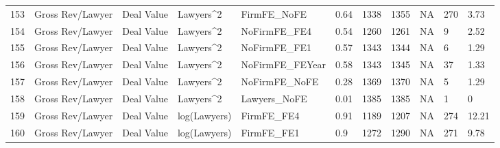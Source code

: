 \documentclass{article}
\begin{document}
\begin{table}[H]
\begin{tabular}{rllllllllll}
  153 & Gross Rev/Lawyer & Deal Value & Lawyers^2 & FirmFE\_NoFE & 0.64 & 1338 & 1355 & NA & 270 & 3.73 \\ 
  154 & Gross Rev/Lawyer & Deal Value & Lawyers^2 & NoFirmFE\_FE4 & 0.54 & 1260 & 1261 & NA & 9 & 2.52 \\ 
  155 & Gross Rev/Lawyer & Deal Value & Lawyers^2 & NoFirmFE\_FE1 & 0.57 & 1343 & 1344 & NA & 6 & 1.29 \\ 
  156 & Gross Rev/Lawyer & Deal Value & Lawyers^2 & NoFirmFE\_FEYear & 0.58 & 1343 & 1345 & NA & 37 & 1.33 \\ 
  157 & Gross Rev/Lawyer & Deal Value & Lawyers^2 & NoFirmFE\_NoFE & 0.28 & 1369 & 1370 & NA & 5 & 1.29 \\ 
  158 & Gross Rev/Lawyer & Deal Value & Lawyers^2 & Lawyers\_NoFE & 0.01 & 1385 & 1385 & NA & 1 & 0 \\ 
  159 & Gross Rev/Lawyer & Deal Value & log(Lawyers) & FirmFE\_FE4 & 0.91 & 1189 & 1207 & NA & 274 & 12.21 \\ 
  160 & Gross Rev/Lawyer & Deal Value & log(Lawyers) & FirmFE\_FE1 & 0.9 & 1272 & 1290 & NA & 271 & 9.78 \\ 
   \hline
\end{tabular}
\end{table}
\end{document}
